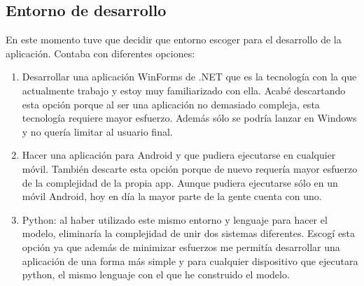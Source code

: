 \subsection{Entorno de desarrollo}
En este momento tuve que decidir que entorno escoger para el desarrollo de la aplicación. Contaba con diferentes opciones:
\begin{enumerate}
    \item Desarrollar una aplicación WinForms de .NET que es la tecnología con la que actualmente trabajo y estoy muy familiarizado con ella. Acabé descartando esta opción porque al ser una aplicación no demasiado compleja, esta tecnología requiere mayor esfuerzo. Además sólo se podría lanzar en Windows y no quería limitar al usuario final. 
    \item Hacer una aplicación para Android y que pudiera ejecutarse en cualquier móvil. También descarte esta opción porque de nuevo requería mayor esfuerzo de la complejidad de la propia app. Aunque pudiera ejecutarse sólo en un móvil Android, hoy en día la mayor parte de la gente cuenta con uno.
    \item Python: al haber utilizado este mismo entorno y lenguaje para hacer el modelo, eliminaría la complejidad de unir dos sistemas diferentes. Escogí esta opción ya que además de minimizar esfuerzos me permitía desarrollar una aplicación de una forma más simple y para cualquier dispositivo que ejecutara python, el mismo lenguaje con el que he construido el modelo. 
\end{enumerate}

